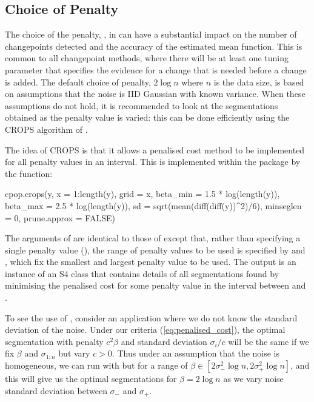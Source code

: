 \documentclass[nojss]{jss}
\begin{document}
\subsection{Choice of Penalty}

The choice of the penalty, , in  can have a substantial impact on the number of changepoints detected and the accuracy of the estimated mean function. This is common to all changepoint methods, where there will be at least one tuning parameter that specifies the evidence for a change that is needed before a change is added. The default choice of penalty, $2\log n$ where $n$ is the data size, is based on assumptions that the noise is IID Gaussian with known variance. When these assumptions do not hold, it is recommended to look at the segmentations obtained as the penalty value is varied: this can be done efficiently using the CROPS algorithm of \cite{haynes2017computationally}. 

The idea of CROPS is that it allows a penalised cost method to be implemented for all penalty values in an interval. This is implemented within the  package by the function:
\begin{CodeInput}
cpop.crops(y, x = 1:length(y), grid = x, beta_min = 1.5 * log(length(y)),
  beta_max = 2.5 * log(length(y)), sd =  sqrt(mean(diff(diff(y))^2)/6), 
  minseglen = 0, prune.approx = FALSE)
\end{CodeInput}
The arguments of  are identical to those of  except that, rather than specifying a single penalty value (), the range of penalty values to be used is specified by  and , which fix the smallest and largest penalty value to be used. The output is an instance of an S4 class that contains details of all segmentations found by minimising the penalised cost for some penalty value in the interval between  and .

To see the use of , consider an application where we do not know the standard deviation of the noise. Under our criteria (\ref{eq:penalised_cost}), the optimal segmentation with penalty $c^2 \beta$ and standard deviation $\sigma_i/c$ will be the same if we fix $\beta$ and $\sigma_{1:n}$ but vary $c>0$. Thus under an assumption that the noise is homogeneous, we can run  with  but for a range of $\beta \in [2\sigma_{-}^2\log n,2\sigma_{+}^2\log n]$, and this will give us the optimal segmentations for $\beta=2 \log n$ as we vary noise standard deviation between $\sigma_{-}$ and $\sigma_{+}$.
\end{document}

